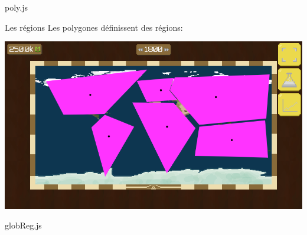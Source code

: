 \documentclass[11pt]{beamer}
\begin{document}
\begin{frame}{poly.js}



\end{frame}

\begin{frame}{Les régions}
Les polygones définissent des régions:
\begin{center} \includegraphics[scale=.3]{../images/regionsPoly} \end{center}
\end{frame}

\begin{frame}{globReg.js}



\end{frame}
\end{document}
